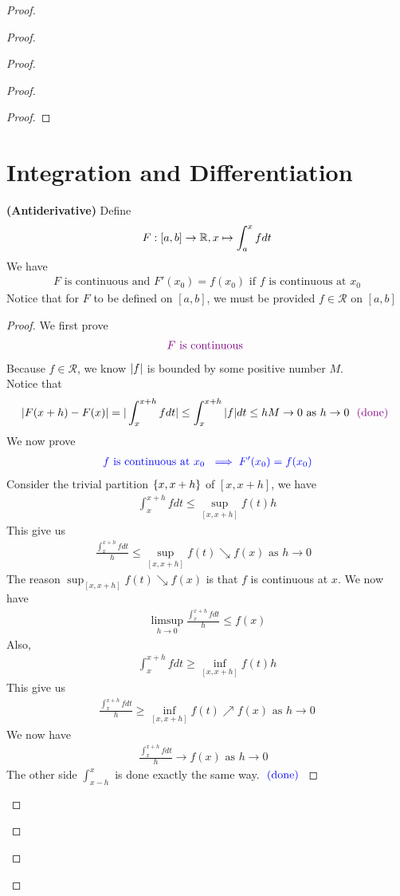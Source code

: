 \documentclass{report}
\begin{document}
\begin{proof}
\begin{proof}
\begin{proof}
\begin{proof}
\begin{proof}
\end{proof}
\section{Integration and Differentiation}
\begin{theorem}
  \textbf{(Antiderivative)} Define
  \begin{align*}
  F:[a,b]\rightarrow \mathbb{R}, x \mapsto  \int_a^x fdt
  \end{align*}
We have 
\begin{align*}
F\text{ is continuous and $F'(x_0)=f(x_0)$ if $f$ is continuous at $x_0$}
\end{align*}
Notice that for $F$ to be defined on  $[a,b]$, we must be provided $f\in \mathscr{R}$ on $[a,b]$ 
\end{theorem}
\begin{proof}
We first prove 
\begin{align*}
\textcolor{violet}{F\text{ is continuous }}
\end{align*}
Because $f\in \mathscr{R}$, we know $|f|$ is bounded by some positive number $M$.\\

Notice that 
\begin{align*}
  |F(x+h)-F(x)|=|\int_x^{x+h} f dt| \leq \int_x^{x+h} |f|dt \leq hM \to 0 \text{ as $h \to 0$ }\textcolor{violet}{\text{ (done) }}
\end{align*}
We now prove 
\begin{align*}
  \textcolor{blue}{f\text{ is continuous at $x_0$ }\implies F'(x_0)=f(x_0)}
\end{align*}
Consider the trivial partition $\{ x,x+h \}$ of $[x,x+h]$, we have 
\begin{align*}
\int_x^{x+h}fdt \leq \sup_{[x,x+h]}f(t)h
\end{align*}
This give us 
\begin{align*}
  \frac{\int_x^{x+h}fdt}{h}\leq \sup_{[x,x+h]}f(t) \searrow f(x) \text{ as $h \to 0$ }
\end{align*}
The reason $\sup_{[x,x+h]}f(t) \searrow f(x)$ is that $f$ is continuous at  $x$. We now have 
\begin{align*}
  \limsup_{h \to 0}  \frac{\int_x^{x+h}fdt}{h} \leq f(x) 
\end{align*}
Also, 
\begin{align*}
\int_{x}^{x+h} fdt \geq \inf_{[x,x+h]}f(t)h
\end{align*}
This give us 
\begin{align*}
\frac{\int_x^{x+h}fdt}{h}\geq \inf_{[x,x+h]}f(t)\nearrow f(x)\text{ as }h \to 0
\end{align*}
We now have 
\begin{align*}
\frac{\int_x^{x+h}fdt}{h} \to f(x) \text{ as $h\to 0$ }
\end{align*}
The other side $\int_{x-h}^x$ is done exactly the same way. $\textcolor{blue}{\text{ (done) }}$


\end{proof}
\end{proof}
\end{proof}
\end{proof}
\end{proof}
\end{document}
